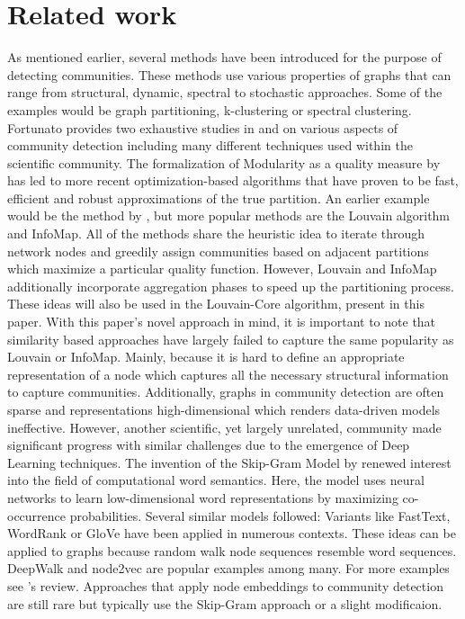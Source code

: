 \documentclass[11pt, twocolumn]{article}
\begin{document}
\section{Related work}
\label{sec:rel_work}
As mentioned earlier, several methods have been introduced for the purpose of detecting communities.\cite{fortunato_CommunityDetectionGraphs_2010} These methods use various properties of graphs that can range from structural, dynamic, spectral to stochastic approaches. Some of the examples would be graph partitioning, k-clustering or spectral clustering. Fortunato provides two exhaustive studies in \citeyear{fortunato_CommunityDetectionGraphs_2010} and \citeyear{fortunato_CommunityDetectionNetworks_2016} on various aspects of community detection including many different techniques used within the scientific community. The formalization of Modularity as a quality measure by \citeauthor{newman_FindingEvaluatingCommunity_2004} has led to more recent optimization-based algorithms that have proven to be fast, efficient and robust approximations of the true partition.\citeyear{fortunato_CommunityDetectionGraphs_2010} An earlier example would be the method by \citeauthor{clauset_FindingCommunityStructure_2004}, but more popular methods are the Louvain algorithm and InfoMap. All of the methods share the heuristic idea to iterate through network nodes and greedily assign communities based on adjacent partitions which maximize a particular quality function. However, Louvain and InfoMap additionally incorporate aggregation phases to speed up the partitioning process. These ideas will also be used in the Louvain-Core algorithm, present in this paper. With this paper's novel approach in mind, it is important to note that similarity based approaches have largely failed to capture the same popularity as Louvain or InfoMap. Mainly, because it is hard to define an appropriate representation of a node which captures all the necessary structural information to capture communities. Additionally, graphs in community detection are often sparse and representations high-dimensional which renders data-driven models ineffective.\cite{cai_ComprehensiveSurveyGraph_2018} However, another scientific, yet largely unrelated, community made significant progress with similar challenges due to the emergence of Deep Learning techniques. The invention of the Skip-Gram Model by \citeauthor{mikolov_DistributedRepresentationsWords_2013} renewed interest into the field of computational word semantics.\cite{mikolov_DistributedRepresentationsWords_2013} Here, the model uses neural networks to learn low-dimensional word representations by maximizing co-occurrence probabilities. Several similar models followed: Variants like FastText, WordRank or GloVe have been applied in numerous contexts.\cite{alvarez_ReviewWordEmbedding_} These ideas can be applied to graphs because random walk node sequences resemble word sequences. DeepWalk and node2vec are popular examples among many. For more examples see \citeauthor{cai_ComprehensiveSurveyGraph_2018}'s review.\cite{cai_ComprehensiveSurveyGraph_2018} Approaches that apply node embeddings to community detection are still rare but typically use the Skip-Gram approach or a slight modificaion. 
\end{document}

